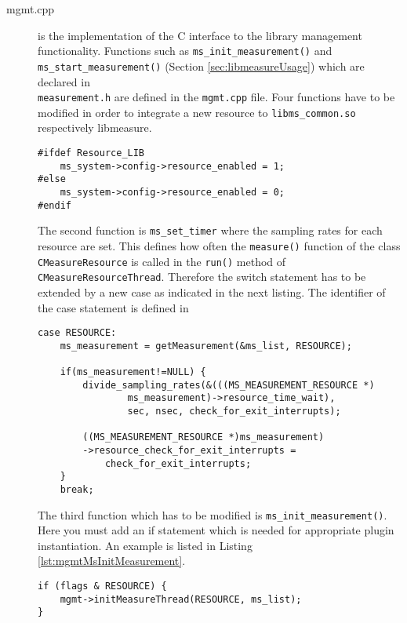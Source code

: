 \begin{description}
\item[mgmt.cpp] is the implementation of the C interface to the library management functionality. Functions such as \texttt{ms\_init\_measurement()} and\\ \texttt{ms\_start\_measurement()} (Section \ref{sec:libmeasureUsage}) which are declared in \\\texttt{measurement.h} are defined in the \texttt{mgmt.cpp} file. Four functions have to be modified in order to integrate a new resource to \texttt{libms\_common.so} respectively libmeasure. 
\begin{lstlisting}[caption={Extension of the \texttt{ms\_init()} function to set the variable \texttt{resource\_enabled}. \added[id=ck]{Listing ist neu}}, label=lst:mgmt_ms_init]
#ifdef Resource_LIB
	ms_system->config->resource_enabled = 1;
#else
	ms_system->config->resource_enabled = 0;
#endif
\end{lstlisting}
The second function is \texttt{ms\_set\_timer} where the sampling rates for each resource are set. This defines how often the \texttt{measure()} function of the class \texttt{CMeasureResource} is called in the \texttt{run()} method of \\\texttt{CMeasureResourceThread}. Therefore the switch statement has to be extended by a new case as indicated in the next listing. The identifier of the case statement is defined in 
\begin{lstlisting}[caption={Code to store resource-specific sampling rates in the \texttt{ms\_set\_timer()} function. \added[id=ck]{Listing aktualisiert}}, label=lst:mgmt]
case RESOURCE:
	ms_measurement = getMeasurement(&ms_list, RESOURCE);
	
	if(ms_measurement!=NULL) {
		divide_sampling_rates(&(((MS_MEASUREMENT_RESOURCE *)
				ms_measurement)->resource_time_wait),
				sec, nsec, check_for_exit_interrupts);
								  
		((MS_MEASUREMENT_RESOURCE *)ms_measurement)
		->resource_check_for_exit_interrupts =
			check_for_exit_interrupts;
	}
	break;
\end{lstlisting}
The third function which has to be modified is \texttt{ms\_init\_measurement()}. Here you must add an if statement which is needed for appropriate plugin instantiation. An example is listed in Listing \ref{lst:mgmtMsInitMeasurement}.
\begin{lstlisting}[caption={Extension of the \texttt{ms\_init\_measurement()} function. \added[id=ck]{Listing aktualisiert}}, label=lst:mgmtMsInitMeasurement]
if (flags & RESOURCE) {
	mgmt->initMeasureThread(RESOURCE, ms_list);
}
\end{lstlisting}


\end{description}
